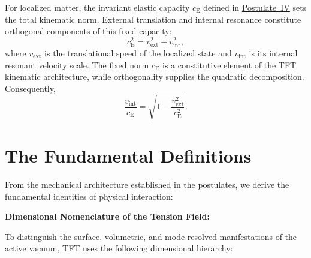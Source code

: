 For localized matter, the invariant elastic capacity $c_{\mathrm E}$ defined in \hyperref[postulate:four]{Postulate~IV} sets the total kinematic norm. External translation and internal resonance constitute orthogonal components of this fixed capacity:
\begin{equation}
    c_{\mathrm E}^{2} = v_{\mathrm{ext}}^{2} + v_{\mathrm{int}}^{2},
\label{eq:kinematic-capacity}
\end{equation}
where $v_{\mathrm{ext}}$ is the translational speed of the localized state and $v_{\mathrm{int}}$ is its internal resonant velocity scale. The fixed norm $c_{\mathrm E}$ is a constitutive element of the TFT kinematic architecture, while orthogonality supplies the quadratic decomposition. Consequently,
\begin{equation}
    \frac{v_{\mathrm{int}}}{c_{\mathrm E}} = \sqrt{ 1-\frac{v_{\mathrm{ext}}^{2}}{c_{\mathrm E}^{2}} }.
\label{eq:internal-rate}
\end{equation}

\section{The Fundamental Definitions}
\label{sec:2.3}
From the mechanical architecture established in the postulates, we derive the fundamental identities of physical interaction:

\vspace{0.5em}
\noindent\textbf{Dimensional Nomenclature of the Tension Field:}

To distinguish the surface, volumetric, and mode-resolved manifestations of the active vacuum, TFT uses the following dimensional hierarchy:

